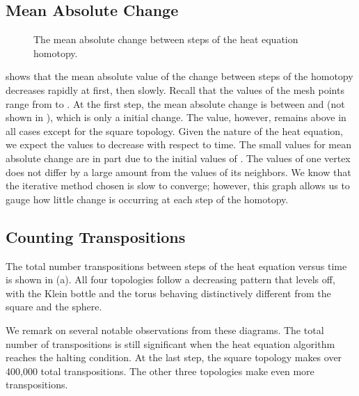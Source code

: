 \subsection{Mean Absolute Change}
\begin{figure}[hbt]
 \vspace*{0.1in}
 \centering
 \centerline{}
 \caption{The mean absolute change between steps of the heat equation homotopy.}
 \label{fig:meanChange}
\end{figure}
 shows that the mean absolute value of the change 
between steps
of the homotopy decreases rapidly at first, then slowly.  Recall that the values of the 
mesh points range from  to .  At the first step, the mean
absolute change is between  and  (not shown in ), 
which is only a  initial change.  The value, 
however, remains above  in all cases except for the square
topology.  Given the nature of the heat equation,
we expect the values to decrease with respect to time.
The small values for mean absolute change are in part due to the initial values of
.  The values of one vertex does not differ by a large amount from the values
of its neighbors.  
We know
that the iterative method chosen is slow to converge; however, this
graph allows us to gauge how little change is occurring at each step of the
homotopy.

\subsection{Counting Transpositions}
The total number transpositions between steps of the heat equation versus 
time is shown in (a).  All four topologies follow a 
decreasing pattern that levels off, with the Klein bottle and the torus behaving
distinctively different from the square and the sphere.  

We remark on several notable observations from these diagrams.  
The total number of transpositions is 
still significant when the heat equation algorithm reaches
the halting condition.  At the last step, the square topology makes over
400,000 total transpositions.  The other three topologies make even more
transpositions.

